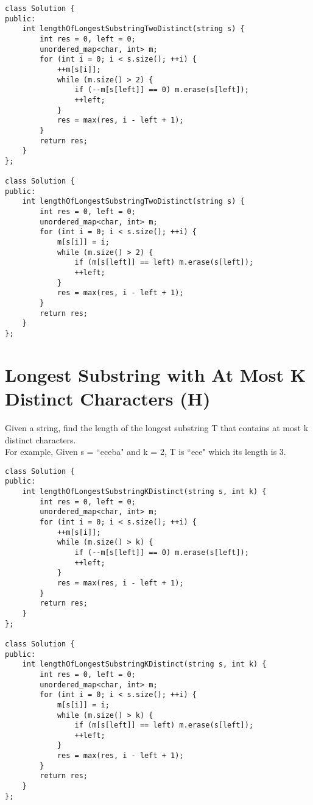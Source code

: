 \begin{lstlisting}
class Solution {
public:
    int lengthOfLongestSubstringTwoDistinct(string s) {
        int res = 0, left = 0;
        unordered_map<char, int> m;
        for (int i = 0; i < s.size(); ++i) {
            ++m[s[i]];
            while (m.size() > 2) {
                if (--m[s[left]] == 0) m.erase(s[left]);
                ++left;
            }
            res = max(res, i - left + 1);
        }
        return res;
    }
};

class Solution {
public:
    int lengthOfLongestSubstringTwoDistinct(string s) {
        int res = 0, left = 0;
        unordered_map<char, int> m;
        for (int i = 0; i < s.size(); ++i) {
            m[s[i]] = i;
            while (m.size() > 2) {
                if (m[s[left]] == left) m.erase(s[left]);
                ++left;
            }
            res = max(res, i - left + 1);
        }
        return res;
    }
};
\end{lstlisting}


\section{Longest Substring with At Most K Distinct Characters (H)}
Given a string, find the length of the longest substring T that contains at most k distinct characters.\\

For example, Given s = ``eceba" and k = 2, T is ``ece" which its length is 3.\\

\begin{lstlisting}
class Solution {
public:
    int lengthOfLongestSubstringKDistinct(string s, int k) {
        int res = 0, left = 0;
        unordered_map<char, int> m;
        for (int i = 0; i < s.size(); ++i) {
            ++m[s[i]];
            while (m.size() > k) {
                if (--m[s[left]] == 0) m.erase(s[left]);
                ++left;
            }
            res = max(res, i - left + 1);
        }
        return res;
    }
};

class Solution {
public:
    int lengthOfLongestSubstringKDistinct(string s, int k) {
        int res = 0, left = 0;
        unordered_map<char, int> m;
        for (int i = 0; i < s.size(); ++i) {
            m[s[i]] = i;
            while (m.size() > k) {
                if (m[s[left]] == left) m.erase(s[left]);
                ++left;
            }
            res = max(res, i - left + 1);
        }
        return res;
    }
};
\end{lstlisting}


